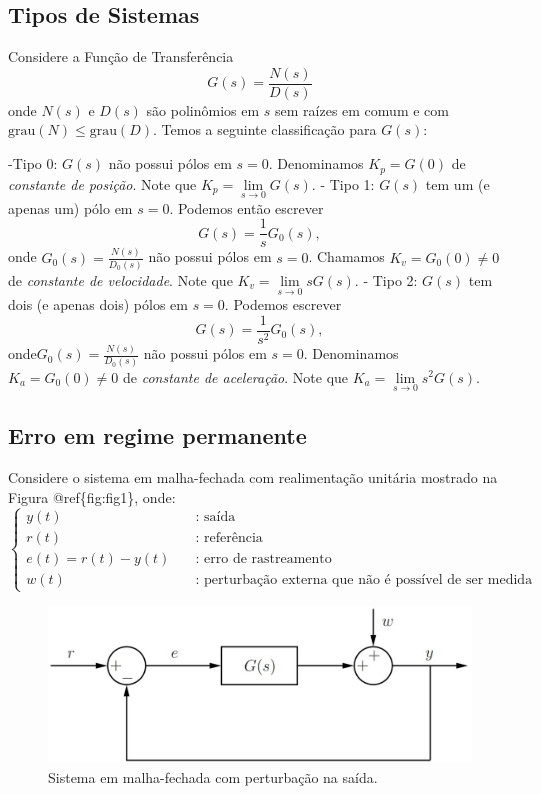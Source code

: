 \documentclass[
]{book}
\begin{document}
\hypertarget{tipos-de-sistemas}{%
\subsection{Tipos de Sistemas}\label{tipos-de-sistemas}}

Considere a Função de Transferência
\[
G(s) = \frac {N(s)}{D(s)}
\]
onde \(N(s)\) e \(D(s)\) são polinômios em \(s\) sem raízes em comum e com \(\text{grau}(N) \leq \text{grau}(D)\). Temos a seguinte classificação para \(G(s)\):

-Tipo 0: \(G(s)\) não possui pólos em \(s=0\). Denominamos \(K_p = G(0)\) de \emph{constante de posição}. Note que \(K_p = \lim\limits_{s \to 0} G(s)\).
- Tipo 1: \(G(s)\) tem um (e apenas um) pólo em \(s=0\). Podemos então escrever
\[
G(s) = \frac {1}{s}G_0(s),
\]
onde \(G_0(s) = \frac {N(s)}{D_0(s)}\) não possui pólos em \(s=0\). Chamamos \(K_v= G_0(0) \neq 0\) de \emph{constante de velocidade}. Note que \(K_v = \lim\limits_{s \to 0} sG(s)\).
- Tipo 2: \(G(s)\) tem dois (e apenas dois) pólos em \(s=0\). Podemos escrever
\[
G(s) = \frac {1}{s^2}G_0(s),
\]
onde\(G_0(s) = \frac {N(s)}{D_0(s)}\) não possui pólos em \(s=0\). Denominamos \(K_a = G_0(0) \neq 0\) de \emph{constante de aceleração}. Note que \(K_a =\lim\limits_{s \to 0} s^2G(s)\).

\hypertarget{erro-em-regime-permanente}{%
\subsection{Erro em regime permanente}\label{erro-em-regime-permanente}}

Considere o sistema em malha-fechada com realimentação unitária mostrado na Figura @ref\{fig:fig1\}, onde:
\[
\begin{cases}
  y(t) & \quad \text{: saída}\\
  r(t) & \quad \text{: referência}\\
  e(t) = r(t)-y(t) & \quad \text{: erro de rastreamento}\\
  w(t) &\quad \text{: perturbação externa que não é possível de ser medida}
\end{cases}
\]

\begin{figure}
\includegraphics[width=1\linewidth]{Imagens/Lab4/Apresentação/fig1} \caption{Sistema em malha-fechada com perturbação na saída.}\label{fig:fig1}
\end{figure}
\end{document}
